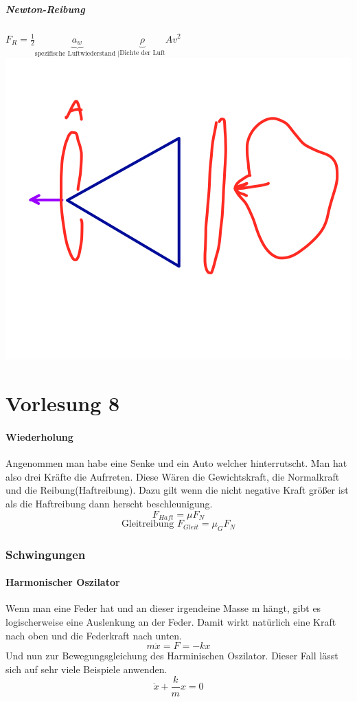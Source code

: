 \documentclass[11pt]{article}
\begin{document}
	\subsubsection{Newton-Reibung}
	$ F_R = \frac{1}{2} \underbrace{a_w}_{\text{spezifische Luftwiederstand |}}  \underbrace{\rho}_{\text{Dichte der Luft}} A v^2 $
	\includegraphics[scale=0.3]{IMG_7A852B76F915-1.jpeg}
	\part{Vorlesung 8}
	\subsection{Wiederholung}
	Angenommen man habe eine Senke und ein Auto welcher hinterrutscht. Man hat also drei Kräfte die Aufrreten. Diese Wären die Gewichtskraft, die Normalkraft und die Reibung(Haftreibung). Dazu gilt wenn die nicht negative Kraft größer ist als die Haftreibung dann herscht beschleunigung.
	\[ F_{Haft} = \mu F_N \]
	\[ \text{Gleitreibung } F_{Gleit} = \mu_G F_N \]
	\section{Schwingungen}
	\subsection{Harmonischer Oszilator}
	Wenn man eine Feder hat und an dieser irgendeine Masse m hängt, gibt es logischerweise eine Auslenkung an der Feder. Damit wirkt natürlich eine Kraft nach oben und die Federkraft nach unten.
	\[ m \ddot{x} = F = - kx  \]
	Und nun zur Bewegungsgleichung des Harminischen Oszilator. Dieser Fall lässt sich auf sehr viele Beispiele  anwenden. 
	\[ \ddot{x} + \frac{k}{m}x = 0 \]
\end{document}
